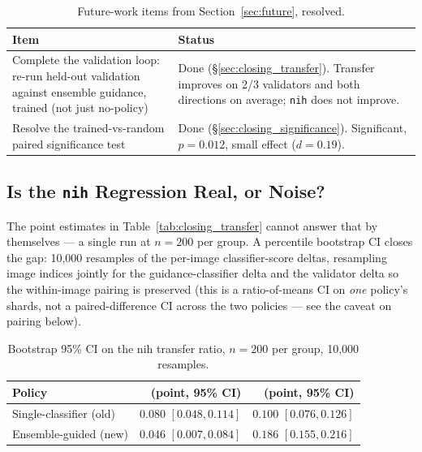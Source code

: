 \begin{table}[h]
\centering
\caption[Status of the two items this chapter addresses]{Future-work items
from Section~\ref{sec:future}, resolved.}
\label{tab:closing_summary}
\begin{tabular}{@{}p{}p{}@{}}
\toprule
\textbf{Item} & \textbf{Status} \\
\midrule
Complete the validation loop: re-run held-out validation against ensemble
guidance, trained (not just no-policy) &
Done (\S\ref{sec:closing_transfer}). Transfer improves on 2/3 validators
and both directions on average; \texttt{nih} \ntop{} does not improve. \\
\addlinespace
Resolve the trained-vs-random paired significance test &
Done (\S\ref{sec:closing_significance}). Significant, $p=0.012$, small
effect ($d=0.19$). \\
\bottomrule
\end{tabular}
\end{table}

\subsection{Is the \texttt{nih} Regression Real, or Noise?}
\label{sec:transfer_bootstrap}

The point estimates in Table~\ref{tab:closing_transfer} cannot answer that
by themselves --- a single run at $n=200$ per group. A percentile
bootstrap CI closes the gap: 10,000 resamples of the per-image
classifier-score deltas, resampling image indices jointly for the
guidance-classifier delta and the validator delta so the within-image
pairing is preserved (this is a ratio-of-means CI on \emph{one} policy's
shards, not a paired-difference CI across the two policies --- see the
caveat on pairing below).

\begin{table}[h]
\centering
\caption{Bootstrap 95\% CI on the nih transfer ratio, $n=200$ per
group, 10,000 resamples.}
\label{tab:transfer_bootstrap}
\begin{tabular}{@{}lrr@{}}
\toprule
\textbf{Policy} & \textbf{\ntop{} (point, 95\% CI)} & \textbf{\pton{} (point, 95\% CI)} \\
\midrule
Single-classifier (old) & $0.080$ $[0.048, 0.114]$ & $0.100$ $[0.076, 0.126]$ \\
Ensemble-guided (new)   & $0.046$ $[0.007, 0.084]$ & $0.186$ $[0.155, 0.216]$ \\
\bottomrule
\end{tabular}
\end{table}

